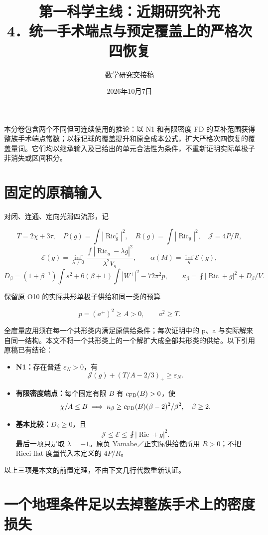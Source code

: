 \documentclass[UTF8,11pt,fontset=none]{ctexart}
\title{第一科学主线：近期研究补充\\[6pt]\large 4．统一手术端点与预定覆盖上的严格次四恢复}
\author{数学研究交接稿}\date{2026年10月7日}
\providecommand{\tightlist}{\setlength{\itemsep}{0pt}\setlength{\parskip}{0pt}}
\theoremstyle{definition}
\theoremstyle{remark}
\begin{document}
\maketitle
\tableofcontents
\clearpage
本分卷包含两个不同但可连续使用的推论：以 N1 和有限密度 FD 的互补范围获得整族手术端点常数；以标记球的覆盖提升和原全成本公式，扩大严格次四恢复的覆盖量词。它们均以继承输入及已给出的单元合法性为条件，不重新证明实际单极子非消失或区间积分。\cite{R03,I01,I02,B01}

\section{固定的原稿输入}\label{v4-ux56faux5b9aux7684ux539fux7a3fux8f93ux5165}

对闭、连通、定向光滑四流形，记

\[
T=2\chi+3\tau,\quad
P(g)=\int|\operatorname{Ric}^{\circ}_g|^2,\quad
R(g)=\int|\operatorname{Ric}_g|^2,
\quad\mathcal J=4P/R,
\] \[
\mathcal E(g)=\inf_{\lambda\ne0}
\frac{\int|\operatorname{Ric}_g-\lambda g|^2}{\lambda^2V_g},
\qquad \alpha(M)=\inf_g\mathcal E(g),
\] \[
D_\beta=(1+\beta^{-1})\int s^2
+6(\beta+1)\int|W^+|^2-72\pi^2p,
\qquad
\kappa_\beta=\fint|\operatorname{Ric}+g|^2+D_\beta/V.
\]

保留原 O10 的实际共形单极子供给和同一类的预算

\[
p=(a^+)^2\ge A>0,\qquad a^2\ge T.
\]

全度量应用须在每一个共形类内满足原供给条件；每次证明中的 p、a 与实际解来自同一结构。本文不将一个共形类上的一个解扩大成全部共形类的供给。以下引用原稿已有结论：

\begin{itemize}
\tightlist
\item
  \textbf{N1：}存在普适 \(\varepsilon_N>0\)，有 \[
  \mathcal J(g)+(T/A-2/3)_+\ge\varepsilon_N.
  \]
\item
  \textbf{有限密度端点：}每个固定有限 \(B\) 有 \(c_{\rm FD}(B)>0\)，使 \[
  \chi/A\le B\implies
  \kappa_\beta\ge c_{\rm FD}(B)(\beta-2)^2/\beta^2,
  \quad\beta\ge2.
  \]
\item
  \textbf{基本比较：}\(D_\beta\ge0\)，且 \[
  \mathcal J\le\mathcal E\le\fint|\operatorname{Ric}+g|^2.
  \] 最后一项只是取 \(\lambda=-1\)。原负 Yamabe／正实际供给使所用 \(R>0\)；不把 Ricci-flat 度量代入未定义的 \(4P/R\)。
\end{itemize}

以上三项是本文的前置定理，不由下文几行代数重新认证。

\section{一个地理条件足以去掉整族手术上的密度损失}\label{v4-ux4e00ux4e2aux5730ux7406ux6761ux4ef6ux8db3ux4ee5ux53bbux6389ux6574ux65cfux624bux672fux4e0aux7684ux5bc6ux5ea6ux635fux5931}
\end{document}
